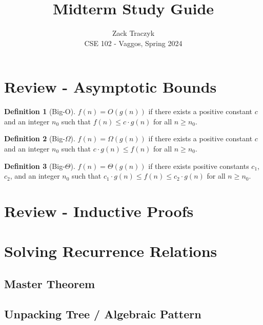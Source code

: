 \documentclass[12pt]{article}
\title{Midterm Study Guide}
\author{Zack Traczyk \\ CSE 102 - Vaggos, Spring 2024}
\date{}
\theoremstyle{definition}
\newtheorem{definition}{Definition}[section]
\begin{document}
	\maketitle

	\tableofcontents

	\pagebreak



	\section{Review - Asymptotic Bounds}

	\begin{definition}[Big-O]
		$f(n) = O(g(n))$ if there exists a positive constant $c$ and an integer
		$n_0$ such that $f(n) \leq c \cdot g(n)$ for all $n \geq n_0$.
	\end{definition}

	\begin{definition}[Big-$\Omega$]
		$f(n) = \Omega(g(n))$ if there exists a positive constant $c$ and an
		integer $n_0$ such that $c \cdot g(n) \leq f(n)$ for all $n \geq n_0$.
	\end{definition}

	\begin{definition}[Big-$\Theta$]
		$f(n) = \Theta(g(n))$ if there exists positive constants $c_1$, $c_2$,
		and an integer $n_0$ such that $c_1 \cdot g(n) \leq f(n) \leq c_2 \cdot
		g(n)$ for all $n \geq n_0$.
	\end{definition}

	\section{Review - Inductive Proofs}

	\section{Solving Recurrence Relations}

	\subsection{Master Theorem}

	\subsection{Unpacking Tree / Algebraic Pattern}
\end{document}
